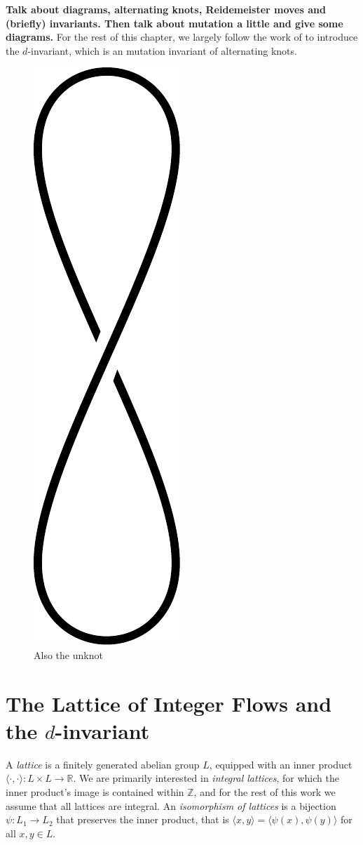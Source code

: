 \documentclass[12pt]{report}
\newcommand{\R}{\mathbb{R}}
\newcommand{\Z}{\mathbb{Z}}
\newcommand{\ip}[2]{\langle #1, #2 \rangle}
\newcommand{\notegreen}[1]{{\color{Green} \textbf{#1}}}
\begin{document}
\notegreen{Talk about diagrams, alternating knots, Reidemeister moves and (briefly) invariants. Then talk about mutation a little and give some diagrams.} For the rest of this chapter, we largely follow the work of \cite{lattices-graphs-mutation} to introduce the $d$-invariant, which is an mutation invariant of alternating knots.

\begin{figure}[hbt]
	\centering
	\includegraphics[width=0.25\linewidth]{graphics/unknot_twisted}
	\caption{Also the unknot}
	\label{fig:unknot_twisted}
\end{figure}

\section{The Lattice of Integer Flows and the $d$-invariant}
A \textit{lattice} is a finitely generated abelian group $L$, equipped with an inner product 
\(\ip{\cdot}{\cdot}: L \times L \longrightarrow \R\). We are primarily interested in \textit{integral lattices}, for which the inner product's image is contained within $\Z$, and for the rest of this work we assume that all lattices are integral. An \textit{isomorphism of lattices} is a bijection $\psi: L_{1} \longrightarrow L_{2}$ that preserves the inner product, that is $\ip{x}{y} = \ip{\psi(x)}{\psi(y)}$ for all $x, y \in L$.
\end{document}
